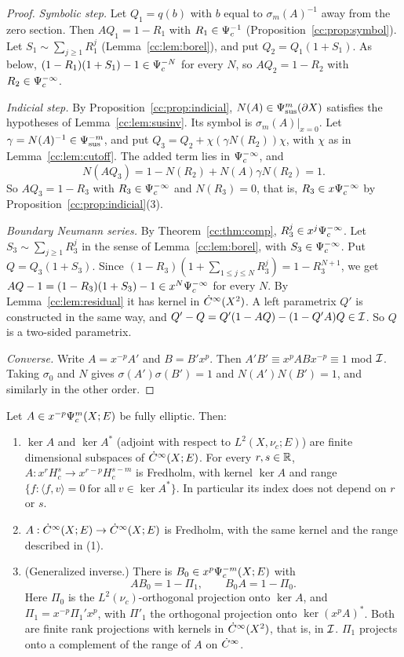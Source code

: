 \begin{proof}
\emph{Symbolic step.} Let \(Q_1=q(b)\) with \(b\) equal to
\(\sigma_m(A)^{-1}\) away from the zero section. Then \(AQ_1=1-R_1\) with
\(R_1\in\Psi_{c}^{-1}\) (Proposition~\ref{cc:prop:symbol}). Let
\(S_1\sim\sum_{j\ge1}R_1^j\) (Lemma~\ref{cc:lem:borel}), and put
\(Q_2=Q_1(1+S_1)\). As below, \((1-R_1)(1+S_1)-1\in\Psi_{c}^{-N}\) for every
\(N\), so \(AQ_2=1-R_2\) with \(R_2\in\Psi_{c}^{-\infty}\).

\emph{Indicial step.} By Proposition~\ref{cc:prop:indicial},
\(N(A)\in\Psi_{\mathrm{sus}}^m(\partial X)\) satisfies the hypotheses of
Lemma~\ref{cc:lem:susinv}. Its symbol is \(\sigma_m(A)|_{x=0}\). Let
\(\gamma=N(A)^{-1}\in\Psi_{\mathrm{sus}}^{-m}\), and put
\(Q_3=Q_2+\chi(\gamma N(R_2))\chi\), with \(\chi\) as in
Lemma~\ref{cc:lem:cutoff}. The added term lies in \(\Psi_{c}^{-\infty}\), and
\[
 N(AQ_3)=1-N(R_2)+N(A)\gamma N(R_2)=1 .
\]
So \(AQ_3=1-R_3\) with \(R_3\in\Psi_{c}^{-\infty}\) and \(N(R_3)=0\), that is,
\(R_3\in x\Psi_{c}^{-\infty}\) by Proposition~\ref{cc:prop:indicial}(3).

\emph{Boundary Neumann series.} By Theorem~\ref{cc:thm:comp},
\(R_3^j\in x^j\Psi_{c}^{-\infty}\). Let \(S_3\sim\sum_{j\ge1}R_3^j\) in the
sense of Lemma~\ref{cc:lem:borel}, with \(S_3\in\Psi_{c}^{-\infty}\). Put \(Q=Q_3(1+S_3)\). Since
\((1-R_3)(1+\sum_{1\le j\le N}R_3^j)=1-R_3^{N+1}\), we get
\(AQ-1=(1-R_3)(1+S_3)-1\in x^{N}\Psi_{c}^{-\infty}\) for every \(N\). By
Lemma~\ref{cc:lem:residual} it has kernel in \(\dot C^\infty(X^2)\). A left parametrix \(Q'\) is constructed in
the same way, and \(Q'-Q=Q'(1-AQ)-(1-Q'A)Q\in\mathcal I\). So \(Q\) is a two-sided
parametrix.

\emph{Converse.} Write \(A=x^{-p}A'\) and \(B=B'x^p\). Then
\(A'B'\equiv x^pABx^{-p}\equiv1\) mod \(\mathcal I\). Taking \(\sigma_0\) and
\(N\) gives \(\sigma(A')\sigma(B')=1\) and \(N(A')N(B')=1\), and similarly
in the other order.
\end{proof}

\begin{theorem}\label{cc:thm:fredholm}
Let \(A\in x^{-p}\Psi_{c}^m(X;E)\) be fully elliptic. Then:
\begin{enumerate}
\item \(\ker A\) and \(\ker A^*\) (adjoint with respect to
\(L^2(X,\nu_c;E)\)) are finite dimensional subspaces of \(\dot C^\infty(X;E)\). For
every \(r,s\in\mathbb R\), \(A:x^rH^s_c\to x^{r-p}H^{s-m}_c\) is Fredholm, with
kernel \(\ker A\) and range \(\{f:\langle f,v\rangle=0\ \text{for all}\
v\in\ker A^*\}\). In particular its index does not depend on \(r\) or
\(s\).
\item \(A:\dot C^\infty(X;E)\to\dot C^\infty(X;E)\) is Fredholm, with the same kernel and the
range described in \textup{(1)}.
\item \textup{(Generalized inverse.)} There is \(B_0\in x^p\Psi_{c}^{-m}
(X;E)\) with
\[
 AB_0=1-\Pi_1,\qquad B_0A=1-\Pi_0 .
\]
Here \(\Pi_0\) is the \(L^2(\nu_c)\)-orthogonal projection onto \(\ker A\),
and \(\Pi_1=x^{-p}\Pi_1'x^p\), with \(\Pi'_1\) the orthogonal projection
onto \(\ker(x^pA)^*\). Both are finite rank projections with kernels in
\(\dot C^\infty(X^2)\), that is, in \(\mathcal I\). \(\Pi_1\) projects onto a complement of
the range of \(A\) on \(\dot C^\infty\).
\end{enumerate}
\end{theorem}

